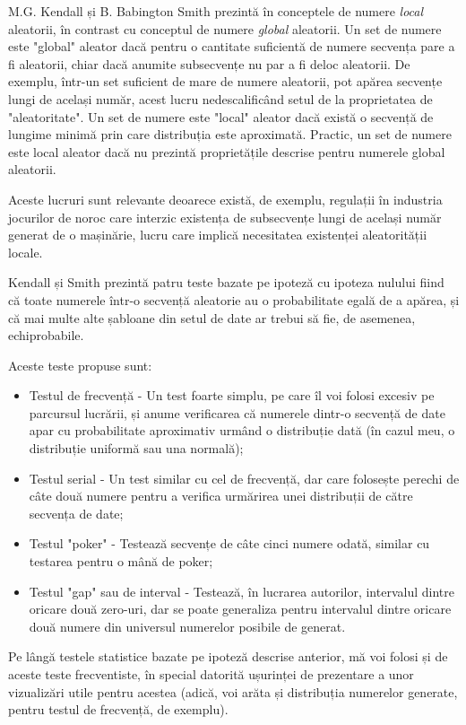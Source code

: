 M.G. Kendall și B. Babington Smith prezintă în \cite{MGKendallBBSmithRandomness}
conceptele de numere \textit{local} aleatorii, în contrast cu conceptul de numere \textit{global} aleatorii. Un set de numere este "global" aleator dacă pentru o cantitate suficientă de numere secvența pare a fi aleatorii, chiar dacă anumite subsecvențe nu par a fi deloc aleatorii. De exemplu, într-un set suficient de mare de numere aleatorii, pot apărea secvențe lungi de același număr, acest lucru nedescalificând setul de la proprietatea de "aleatoritate". Un set de numere este "local" aleator dacă există o secvență de lungime minimă prin care distribuția este aproximată. Practic, un set de numere este local aleator dacă nu prezintă proprietățile descrise pentru numerele global aleatorii. 

Aceste lucruri sunt relevante deoarece există, de exemplu, regulații în industria jocurilor de noroc care interzic existența de subsecvențe lungi de același număr generat de o mașinărie, lucru care implică necesitatea existenței aleatorității locale.

Kendall și Smith prezintă patru teste bazate pe ipoteză cu ipoteza nulului fiind că toate numerele într-o secvență aleatorie au o probabilitate egală de a apărea, și că mai multe alte șabloane din setul de date ar trebui să fie, de asemenea, echiprobabile.

Aceste teste propuse sunt:
\begin{itemize}
    \item Testul de frecvență - Un test foarte simplu, pe care îl voi folosi excesiv pe parcursul lucrării, și anume verificarea că numerele dintr-o secvență de date apar cu probabilitate aproximativ urmând o distribuție dată (în cazul meu, o distribuție uniformă sau una normală);
    \item Testul serial - Un test similar cu cel de frecvență, dar care folosește perechi de câte două numere pentru a verifica urmărirea unei distribuții de către secvența de date;
    \item Testul "poker" - Testează secvențe de câte cinci numere odată, similar cu testarea pentru o mână de poker;
    \item Testul "gap" sau de interval - Testează, în lucrarea autorilor, intervalul dintre oricare două zero-uri, dar se poate generaliza pentru intervalul dintre oricare două numere din universul numerelor posibile de generat.
\end{itemize}

Pe lângă testele statistice bazate pe ipoteză descrise anterior, mă voi folosi și de aceste teste frecventiste, în special datorită ușurinței de prezentare a unor vizualizări utile pentru acestea (adică, voi arăta și distribuția numerelor generate, pentru testul de frecvență, de exemplu).

